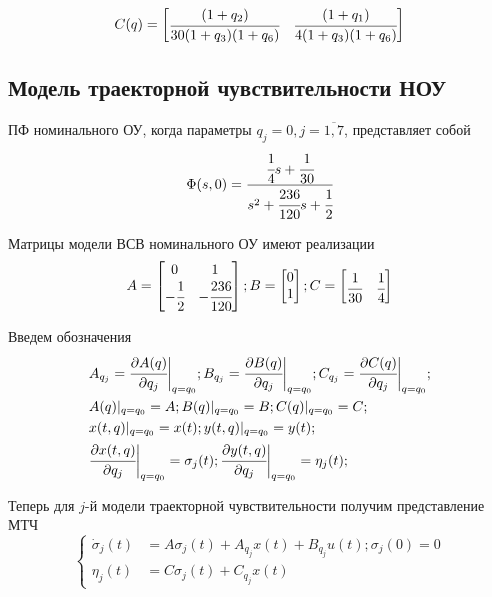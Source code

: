 \begin{equation}
	C(q) =
	\begin{bmatrix}
	\cfrac{(1 + q_2)}{30(1+q_3)(1+q_6)} & \cfrac{(1 + q_1)}{4(1+q_3)(1+q_6)} 
	\end{bmatrix}
\end{equation}

\subsection{Модель траекторной чувствительности НОУ}

ПФ номинального ОУ, когда параметры $q_{j} = 0, j = \overline{1,7}$, представляет собой
\begin{equation}
	\Phi(s, 0) = \cfrac{\cfrac{1}{4} s + \cfrac{1}{30}}{s^2 + \cfrac{236}{120} s + \cfrac{1}{2}} 
\end{equation}

Матрицы модели ВСВ номинального ОУ имеют реализации
\begin{align*}
A =
\begin{bmatrix}
0 & 1 \\
- \cfrac{1}{2} & - \cfrac{236}{120}
\end{bmatrix};
B =
\begin{bmatrix}
0\\
1
\end{bmatrix};
C =
\begin{bmatrix}
\cfrac{1}{30} & \cfrac{1}{4}
\end{bmatrix}
\end{align*}

Введем обозначения
\begin{align*}
	&A_{q_j} = \cfrac{\partial{A(q)}}{\partial{q_j}} \bigg|_{q=q_0};
	B_{q_j} = \cfrac{\partial{B(q)}}{\partial{q_j}} \bigg|_{q=q_0};
	C_{q_j} = \cfrac{\partial{C(q)}}{\partial{q_j}} \bigg|_{q=q_0};\\
	&A(q)|_{q=q_0} = A;
	B(q)|_{q=q_0} = B;
	C(q)|_{q=q_0} = C;\\
	&x(t,q)|_{q=q_0} = x(t);
	y(t,q)|_{q=q_0} = y(t);\\
	&\cfrac{\partial{x(t,q)}}{\partial{q_j}} \bigg|_{q=q_0} = \sigma_j(t);
	\cfrac{\partial{y(t,q)}}{\partial{q_j}} \bigg|_{q=q_0} = \eta_j(t);
\end{align*}

Теперь для $j$-й модели траекторной чувствительности получим представление МТЧ
\begin{equation}\label{eq_mts}
	\begin{cases}
		\dot \sigma_j(t) &= A \sigma_j(t) + A_{q_j} x(t) + B_{q_j} u(t); 
		\sigma_j (0) = 0\\
		\eta_j (t) &= C \sigma_j (t) + C_{q_j} x(t)
	\end{cases}
\end{equation}

